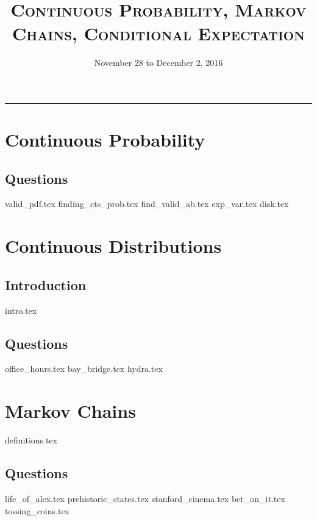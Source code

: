 \documentclass{exam}
\title{\textsc{Continuous Probability, Markov Chains, Conditional Expectation}}
\date{November 28 to December 2, 2016}
\begin{document}
\maketitle
\rule{\textwidth}{0.15em}
\fontsize{12}{15}\selectfont
\thispagestyle{empty}

\section{Continuous Probability}
\subsection{Questions}
\begin{questions}
{valid_pdf.tex}
{finding_cts_prob.tex}
{find_valid_ab.tex}
{exp_var.tex}
{disk.tex}
\end{questions}

\section{Continuous Distributions}
\subsection{Introduction}
{intro.tex}
\subsection{Questions}
\begin{questions}
{office_hours.tex}
{bay_bridge.tex}
{hydra.tex}
\end{questions}

\section{Markov Chains}
{definitions.tex}
\subsection{Questions}
\begin{questions}
{life_of_alex.tex}
{prehistoric_states.tex}
{stanford_cinema.tex}
{bet_on_it.tex}
{tossing_coins.tex}
\end{questions}
\end{document}
